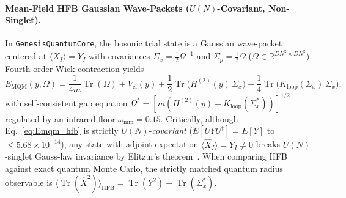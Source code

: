 \documentclass[11pt,a4paper]{article}
\DeclareMathOperator{\Tr}{Tr}
\begin{document}
\paragraph{Mean-Field HFB Gaussian Wave-Packets ($U(N)$-Covariant, Non-Singlet).}
In \texttt{GenesisQuantumCore}, the bosonic trial state is a Gaussian wave-packet centered at $\langle\hat{X}_I\rangle = Y_I$ with covariances $\Sigma_x = \frac{1}{2}\Omega^{-1}$ and $\Sigma_p = \frac{1}{2}\Omega$ ($\Omega \in \mathbb{R}^{DN^2\times DN^2}$). Fourth-order Wick contraction yields
\begin{equation}
  E_{\mathrm{MQM}}(y, \Omega) = \frac{1}{4m}\Tr(\Omega) + V_{\mathrm{cl}}(y)
  + \frac{1}{2}\Tr\!\big(H^{(2)}(y)\,\Sigma_x\big)
  + \frac{1}{4}\Tr\!\big(K_{\mathrm{loop}}(\Sigma_x)\,\Sigma_x\big),
  \label{eq:Emqm_hfb}
\end{equation}
with self-consistent gap equation $\Omega^* = [m(H^{(2)}(y) + K_{\mathrm{loop}}(\Sigma_x^*))]^{1/2}$ regulated by an infrared floor $\omega_{\min} = 0.15$. Critically, although Eq.~\eqref{eq:Emqm_hfb} is strictly $U(N)$-\emph{covariant} ($E[UYU^\dagger] = E[Y]$ to $\le 5.68\times 10^{-14}$), any state with adjoint expectation $\langle\hat{X}_I\rangle = Y_I \neq 0$ breaks $U(N)$-singlet Gauss-law invariance by Elitzur's theorem~\cite{Elitzur1975}. When comparing HFB against exact quantum Monte Carlo, the strictly matched quantum radius observable is $\langle\Tr(\hat{X}^2)\rangle_{\mathrm{HFB}} = \Tr(Y^2) + \Tr(\Sigma_x^*)$.
\end{document}
